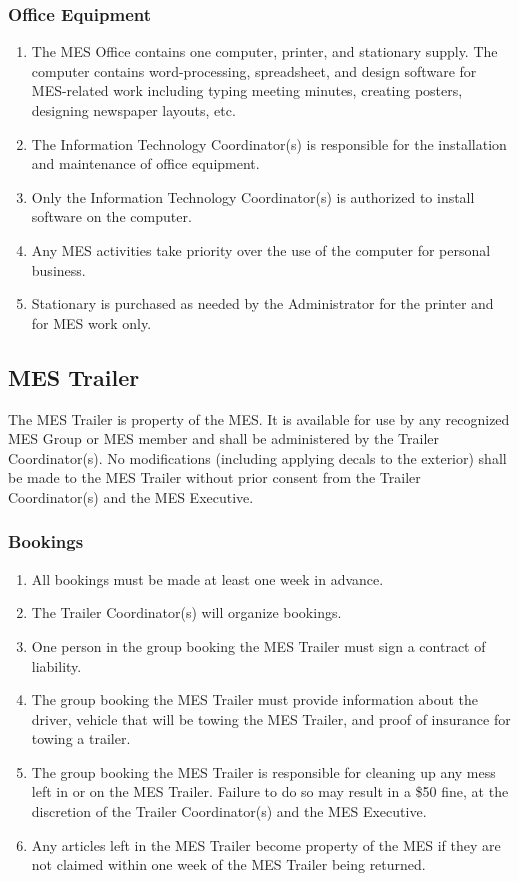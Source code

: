 \subsubsection{Office Equipment}
\label{office-equipment}
\begin{enumerate}
 \item
  The MES Office contains one computer, printer, and stationary supply.
  The computer contains word-processing, spreadsheet, and design
  software for MES-related work including typing meeting minutes,
  creating posters, designing newspaper layouts, etc.
 \item
  The Information Technology Coordinator(s) is responsible for the
  installation and maintenance of office equipment.
 \item
  Only the Information Technology Coordinator(s) is authorized to
  install software on the computer.
 \item
  Any MES activities take priority over the use of the computer for
  personal business.
 \item
  Stationary is purchased as needed by the Administrator for the printer
  and for MES work only.

\end{enumerate}

\subsection{MES Trailer}
\label{mes-trailer}
The MES Trailer is property of the MES. It is available for use by any
recognized MES Group or MES member and shall be administered by the
Trailer Coordinator(s). No modifications (including applying decals to
the exterior) shall be made to the MES Trailer without prior consent
from the Trailer Coordinator(s) and the MES Executive.

\subsubsection{Bookings}
\label{bookings}

\begin{enumerate}
 \item
  All bookings must be made at least one week in advance.
 \item
  The Trailer Coordinator(s) will organize bookings.
 \item
  One person in the group booking the MES Trailer must sign a contract
  of liability.
 \item
  The group booking the MES Trailer must provide information about the
  driver, vehicle that will be towing the MES Trailer, and proof of
  insurance for towing a trailer.
 \item
  The group booking the MES Trailer is responsible for cleaning up any
  mess left in or on the MES Trailer. Failure to do so may result in a
  \$50 fine, at the discretion of the Trailer Coordinator(s) and the MES
  Executive.
 \item
  Any articles left in the MES Trailer become property of the MES if
  they are not claimed within one week of the MES Trailer being
  returned.

\end{enumerate}

